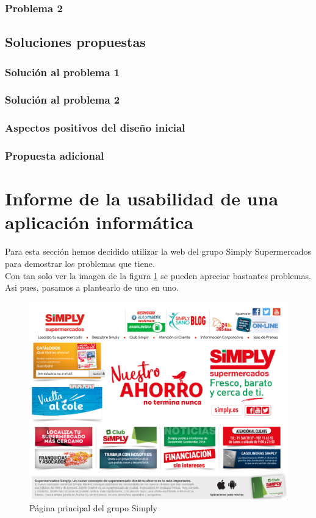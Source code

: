 \documentclass[a4paper,11pt]{article}
\begin{document}
\subsubsection{Problema 2}

\subsection{Soluciones propuestas}
\subsubsection{Solución al problema 1}
\subsubsection{Solución al problema 2}
\subsubsection{Aspectos positivos del diseño inicial}
\subsubsection{Propuesta adicional}




\section{Informe de la usabilidad de una aplicación informática}
Para esta sección hemos decidido utilizar la web del grupo Simply Supermercados \cite{webSimply} para demostrar los problemas que tiene.\\
Con tan solo ver la imagen de la figura \ref{fig:pagprin} se pueden apreciar bastantes problemas. Asi pues, pasamos a plantearlo de uno en uno.

\begin{figure}
 \centering
 \includegraphics[scale=0.5]{webPrincipal.png}
 \caption{Página principal del grupo Simply}
 \label{fig:pagprin}
\end{figure}
\end{document}
